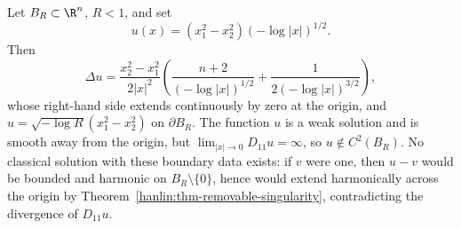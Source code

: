 \begin{example}\label{hanlin:weaksol-part1-example-3-12}
Let $B_R\subset\R^n$, $R<1$, and set
\[
u(x)=(x_1^2-x_2^2)(-\log|x|)^{1/2}.
\]
Then
\[
\Delta u=
\frac{x_2^2-x_1^2}{2|x|^2}
\left(\frac{n+2}{(-\log|x|)^{1/2}}
+\frac{1}{2(-\log|x|)^{3/2}}\right),
\]
whose right-hand side extends continuously by zero at the origin, and
$u=\sqrt{-\log R}(x_1^2-x_2^2)$ on $\partial B_R$. The function $u$ is a
weak solution and is smooth away from the origin, but
$\lim_{|x|\to0}D_{11}u=\infty$, so $u\notin C^2(B_R)$. No classical
solution with these boundary data exists: if $v$ were one, then $u-v$ would
be bounded and harmonic on $B_R\setminus\{0\}$, hence would extend
harmonically across the origin by
Theorem~\ref{hanlin:thm-removable-singularity}, contradicting the divergence
of $D_{11}u$.
\end{example}
